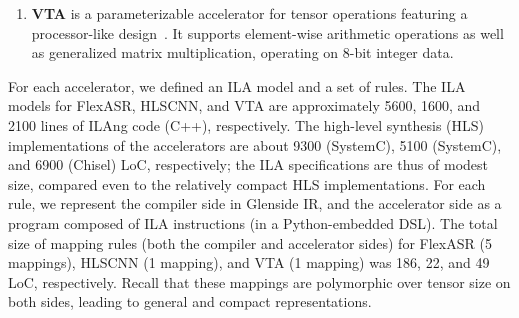 \begin{enumerate}[leftmargin=*]
\item \textbf{VTA} is a parameterizable accelerator for tensor operations featuring a processor-like design~\cite{moreau2019hardware}.
%
It supports element-wise arithmetic operations as well as generalized matrix multiplication,
operating on 8-bit integer data.
%

\end{enumerate}
%
For each accelerator, we defined an ILA model and a set of \mapping rules.
%
The ILA models for FlexASR, HLSCNN, and VTA are approximately 5600, 1600, and 2100 lines of ILAng code (C++), respectively. 
The high-level synthesis (HLS) implementations
  of the accelerators are about 9300 (SystemC), 5100 (SystemC), and 6900 (Chisel) LoC, %
  respectively;
  the ILA specifications are thus of modest size,
  compared even to the relatively compact HLS implementations. 
%
For each \mapping rule, we represent the compiler side in Glenside IR, and the accelerator side %
as a program composed of ILA instructions (in a Python-embedded DSL). 
The total size of mapping rules (both the compiler and accelerator sides) for FlexASR (5 mappings), HLSCNN (1 mapping), and VTA (1 mapping) was 186, 22, and 49 LoC, respectively.
Recall that these mappings are polymorphic over tensor size on both sides, leading to general and compact representations. 
